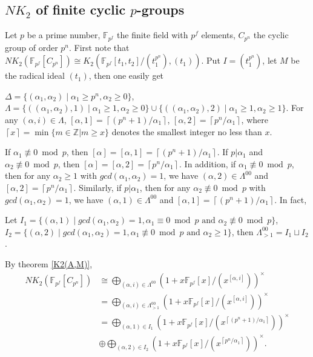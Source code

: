 \subsection{$NK_2$ of finite cyclic $p$-groups}
Let $p$ be a prime number, $\mathbb{F}_{p^f}$ the finite field with $p^f$ elements, $C_{p^n}$ the cyclic group of order $p^n$. First note that $NK_2(\mathbb{F}_{p^f}[C_{p^n}]) \cong K_2(\mathbb{F}_{p^f}[t_1,t_2]/(t_1^{p^n}),(t_1))$. Put $I=(t_1^{p^n})$, let $M$ be the radical ideal $(t_1)$, then one easily get
\begin{lemma}
	$\Delta =\{(\alpha_1,\alpha_2)\mid \alpha_1\geq p^n, \alpha_2 \geq 0\}$, $\Lambda = \{((\alpha_1,\alpha_2),1) \mid \alpha_1\geq 1, \alpha_2\geq 0\}\cup \{((\alpha_1,\alpha_2),2) \mid \alpha_1\geq 1, \alpha_2\geq 1\}$. For any $(\alpha,i)\in \Lambda$, $[\alpha,1]=\left \lceil (p^n+1)/\alpha_1 \right \rceil$, $[\alpha,2]=\left \lceil p^n/\alpha_1 \right \rceil$, where $\left \lceil x \right \rceil=\min \{m\in \mathbb{Z}|m\geq x\}$ denotes the smallest integer no less than $x$.
\end{lemma}
If $\alpha_1 \not\equiv 0 \bmod p$, then $[\alpha]=[\alpha,1]=\left \lceil (p^n+1)/\alpha_1 \right \rceil$. If $p | \alpha_1$ and $\alpha_2 \not\equiv 0 \bmod p$, then $[\alpha]=[\alpha,2]=\left \lceil p^n/\alpha_1 \right \rceil$. In addition, if $\alpha_1 \not\equiv 0 \bmod p$, then for any $\alpha_2\geq 1$ with $gcd(\alpha_1,\alpha_2)=1$, we have $(\alpha,2)\in \Lambda^{00}$ and $[\alpha,2]=\left \lceil p^n/\alpha_1 \right \rceil$. Similarly, if $p| \alpha_1$, then for any $\alpha_2 \not\equiv 0 \bmod p$ with $gcd(\alpha_1,\alpha_2)=1$, we have $(\alpha,1)\in \Lambda^{00}$ and $[\alpha,1]=\left \lceil (p^n+1)/\alpha_1 \right \rceil$. In fact, 
\begin{lemma}
Let $I_1 =\{(\alpha,1)\mid gcd(\alpha_1,\alpha_2)=1, \alpha_1 \equiv 0 \bmod p \text{ and } \alpha_2 \not\equiv 0 \bmod p\}$, $I_2=\{(\alpha,2)\mid gcd(\alpha_1,\alpha_2)=1, \alpha_1 \not\equiv 0 \bmod p \text{ and } \alpha_2 \geq 1\}$, then $\Lambda^{00}_{>1}=I_1\sqcup I_2$. 
\end{lemma}
By theorem \ref{K2(A,M)}, 
\begin{align*}
NK_2(\mathbb{F}_{p^f}[C_{p^n}]) &\cong \bigoplus_{(\alpha,i)\in\Lambda^{00}}(1+x\mathbb{F}_{p^f}[x]/(x^{[\alpha,i]}))^{\times}\\
& = \bigoplus_{(\alpha,i)\in \Lambda^{00}_{>1}}(1+x\mathbb{F}_{p^f}[x]/(x^{[\alpha,i]}))^{\times}\\
& = \bigoplus_{(\alpha,1)\in I_1}(1+x\mathbb{F}_{p^f}[x]/(x^{\left \lceil (p^n+1)/\alpha_1 \right \rceil}))^{\times} \\
& \oplus \bigoplus_{(\alpha,2)\in I_2}(1+x\mathbb{F}_{p^f}[x]/(x^{\left \lceil p^n/\alpha_1 \right \rceil}))^{\times}.
\end{align*}
